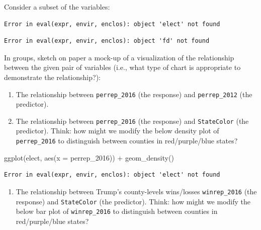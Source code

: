 \documentclass[
  letterpaper,
  DIV=11,
  numbers=noendperiod]{scrreprt}
\newenvironment{Shaded}{\begin{snugshade}}{\end{snugshade}}
\newcommand{\AttributeTok}[1]{\textcolor[rgb]{0.40,0.45,0.13}{#1}}
\newcommand{\FunctionTok}[1]{\textcolor[rgb]{0.28,0.35,0.67}{#1}}
\newcommand{\NormalTok}[1]{\textcolor[rgb]{0.00,0.23,0.31}{#1}}
\newcommand{\SpecialCharTok}[1]{\textcolor[rgb]{0.37,0.37,0.37}{#1}}
\providecommand{\tightlist}{%
  \setlength{\itemsep}{0pt}\setlength{\parskip}{0pt}}\usepackage{longtable,booktabs,array}
\begin{document}
\begin{Shaded}
\begin{Highlighting}[]
\NormalTok{Consider a subset  of the variables: }
\end{Highlighting}
\end{Shaded}

\begin{verbatim}
Error in eval(expr, envir, enclos): object 'elect' not found
\end{verbatim}

\begin{verbatim}
Error in eval(expr, envir, enclos): object 'fd' not found
\end{verbatim}

In groups, sketch on paper a mock-up of a visualization of the
relationship between the given pair of variables (i.e., what type of
chart is appropriate to demonstrate the relationship?):

\begin{enumerate}
\def\labelenumi{\alph{enumi}.}
\item
  The relationship between \texttt{perrep\_2016} (the response) and
  \texttt{perrep\_2012} (the predictor).
\item
  The relationship between \texttt{perrep\_2016} (the response) and
  \texttt{StateColor} (the predictor). Think: how might we modify the
  below density plot of \texttt{perrep\_2016} to distinguish between
  counties in red/purple/blue states?
\end{enumerate}

\begin{Shaded}
\begin{Highlighting}[]
\FunctionTok{ggplot}\NormalTok{(elect, }\FunctionTok{aes}\NormalTok{(}\AttributeTok{x =}\NormalTok{ perrep\_2016)) }\SpecialCharTok{+}
  \FunctionTok{geom\_density}\NormalTok{()}
\end{Highlighting}
\end{Shaded}

\begin{verbatim}
Error in eval(expr, envir, enclos): object 'elect' not found
\end{verbatim}

\begin{enumerate}
\def\labelenumi{\alph{enumi}.}
\setcounter{enumi}{2}
\tightlist
\item
  The relationship between Trump's county-levels wins/losses
  \texttt{winrep\_2016} (the response) and \texttt{StateColor} (the
  predictor). Think: how might we modify the below bar plot of
  \texttt{winrep\_2016} to distinguish between counties in
  red/purple/blue states?
\end{enumerate}
\end{document}
